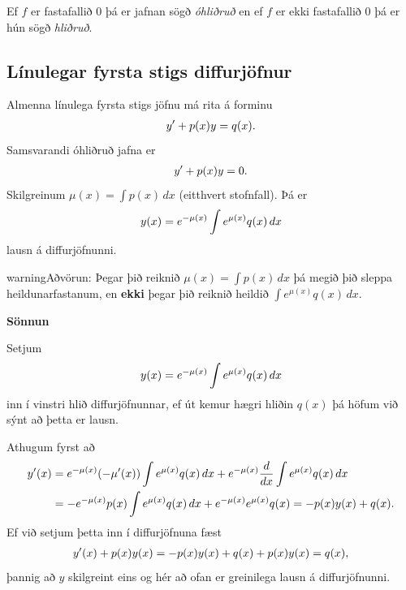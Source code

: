 \documentclass[a4paper,10pt,icelandic]{sphinxmanual}
\begin{document}
Ef \(f\) er fastafallið \(0\) þá er jafnan sögð \textit{óhliðruð}
en ef \(f\) er ekki fastafallið \(0\) þá er hún
sögð \textit{hliðruð}.


\subsection{Línulegar fyrsta stigs diffurjöfnur}
\label{kafli08:id2}\label{kafli08:index-4}
Almenna línulega fyrsta stigs jöfnu má rita á forminu
\begin{gather}
\begin{split}y'+p(x)y=q(x).\end{split}\notag
\end{gather}
Samsvarandi óhliðruð jafna er
\begin{gather}
\begin{split}y'+p(x)y=0.\end{split}\notag
\end{gather}
Skilgreinum \(\mu(x)=\int p(x)\,dx\) (eitthvert stofnfall). Þá er
\begin{gather}
\begin{split}y(x)=e^{-\mu(x)}\int e^{\mu(x)}q(x)\,dx\end{split}\notag
\end{gather}
lausn á diffurjöfnunni.

\begin{notice}{warning}{Aðvörun:}
Þegar þið reiknið \(\mu(x)=\int p(x)\,dx\) þá megið þið sleppa
heildunarfastanum, en \textbf{ekki} þegar þið reiknið heildið
\(\int e^{\mu(x)}q(x)\,dx\).
\end{notice}

\textbf{Sönnun}

Setjum
\begin{gather}
\begin{split}y(x)=e^{-\mu(x)}\int e^{\mu(x)}q(x)\,dx\end{split}\notag
\end{gather}
inn í vinstri hlið diffurjöfnunnar, ef út kemur hægri hliðin \(q(x)\) þá
höfum við sýnt að þetta er lausn.

Athugum fyrst að
\begin{gather}
\begin{split}\begin{aligned}
y'(x) &=e^{-\mu(x)}(-\mu'(x)) \int e^{\mu(x)}q(x)\, dx + e^{-\mu(x)} \frac{d}{dx} \int e^{\mu(x)}q(x)\,dx \\
&= -e^{-\mu(x)}p(x)\int e^{\mu(x)}q(x)\, dx +  e^{-\mu(x)} e^{\mu(x)}q(x) = -p(x)y(x) + q(x).
\end{aligned}\end{split}\notag
\end{gather}
Ef við setjum þetta inn í diffurjöfnuna fæst
\begin{gather}
\begin{split}y'(x) + p(x)y(x) = -p(x)y(x) + q(x) + p(x)y(x) = q(x),\end{split}\notag
\end{gather}
þannig að \(y\) skilgreint eins og hér að ofan er greinilega lausn á diffurjöfnunni.
\end{document}
